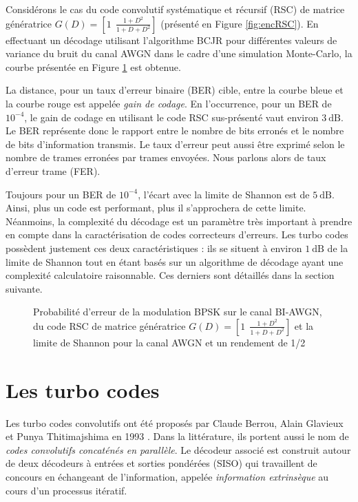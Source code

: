 Considérons le cas du code convolutif systématique et récursif (RSC) de matrice génératrice 
$G(D) = \left[ 1 ~~\frac{1+D^2}{1+D+D^2} \right]$ (présenté en Figure \ref{fig:encRSC}). 
En effectuant un décodage utilisant l'algorithme BCJR pour différentes valeurs de variance du bruit du canal AWGN dans le 
cadre d'une simulation Monte-Carlo, la courbe présentée en Figure \ref{fig:berBPSK} est obtenue. 

La distance, pour un taux d'erreur binaire (BER) cible, entre la courbe bleue et la courbe rouge est appelée \emph{gain de 
	codage}. En l'occurrence, pour un BER de $10 ^{-4}$, le gain de codage en utilisant le code RSC sus-présenté vaut
environ $3~\text{dB}$. Le BER représente donc le rapport entre le nombre de bits erronés et le nombre de bits 
d'information transmis. Le taux d'erreur peut aussi être exprimé selon le nombre de trames erronées par trames envoyées. 
Nous parlons alors de taux d'erreur trame (FER).

Toujours pour un BER de $10 ^{-4}$, l'écart avec la limite de Shannon est de $5~\text{dB}$. Ainsi, plus un code est performant, 
plus il s'approchera de cette limite. Néanmoins, la complexité du décodage est un paramètre très important à prendre en
compte dans la caractérisation de codes correcteurs d'erreurs. Les turbo codes possèdent justement ces deux caractéristiques : ils se 
situent à environ $1~\text{dB}$ de la limite de Shannon tout en étant basés sur un algorithme de décodage ayant une complexité 
calculatoire raisonnable. Ces derniers sont détaillés dans la section suivante.


\begin{figure}[!h]
	\centering
	
	\caption{\label{fig:berBPSK} Probabilité d'erreur de la modulation BPSK sur le canal BI-AWGN, du code RSC de matrice génératrice $G(D) = \left[ 1 ~~\frac{1+D^2}{1+D+D^2} \right]$ et la limite de Shannon pour la canal AWGN et un rendement de 1/2} 
\end{figure}
		
		
\section{Les turbo codes}
Les turbo codes convolutifs ont été proposés par Claude Berrou, Alain Glavieux et Punya Thitimajshima en 1993 
\cite{berrouTC}. Dans la littérature, ils portent aussi le nom de \emph{codes convolutifs concaténés en parallèle}. 
Le décodeur associé est construit autour de deux décodeurs à entrées et sorties pondérées (SISO) qui travaillent de concours en échangeant de 
l'information, appelée \emph{information extrinsèque} au cours d'un processus itératif. 

